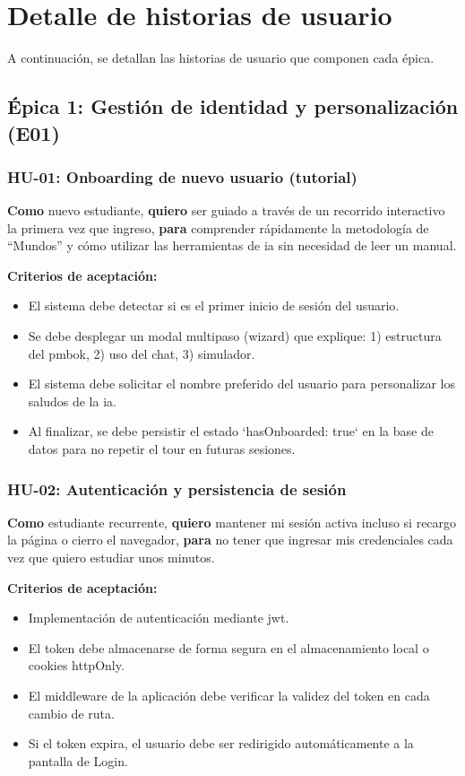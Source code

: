 \section{Detalle de historias de usuario}

A continuación, se detallan las historias de usuario que componen cada épica.

\subsection{Épica 1: Gestión de identidad y personalización (E01)}

\subsubsection{HU-01: Onboarding de nuevo usuario (tutorial)}
\textbf{Como} nuevo estudiante,
\textbf{quiero} ser guiado a través de un recorrido interactivo la primera vez que ingreso,
\textbf{para} comprender rápidamente la metodología de \enquote{Mundos} y cómo utilizar las herramientas de \gls{ia} sin necesidad de leer un manual.

\textbf{Criterios de aceptación:}
\begin{itemize}
\item El sistema debe detectar si es el primer inicio de sesión del usuario.
\item Se debe desplegar un modal multipaso (wizard) que explique: 1) estructura del \gls{pmbok}, 2) uso del chat, 3) simulador.
\item El sistema debe solicitar el nombre preferido del usuario para personalizar los saludos de la \gls{ia}.
\item Al finalizar, se debe persistir el estado `hasOnboarded: true` en la base de datos para no repetir el tour en futuras sesiones.
\end{itemize}

\subsubsection{HU-02: Autenticación y persistencia de sesión}
\textbf{Como} estudiante recurrente,
\textbf{quiero} mantener mi sesión activa incluso si recargo la página o cierro el navegador,
\textbf{para} no tener que ingresar mis credenciales cada vez que quiero estudiar unos minutos.

\textbf{Criterios de aceptación:}
\begin{itemize}
\item Implementación de autenticación mediante \gls{jwt}.
\item El token debe almacenarse de forma segura en el almacenamiento local o cookies httpOnly.
\item El middleware de la aplicación debe verificar la validez del token en cada cambio de ruta.
\item Si el token expira, el usuario debe ser redirigido automáticamente a la pantalla de Login.
\end{itemize}


